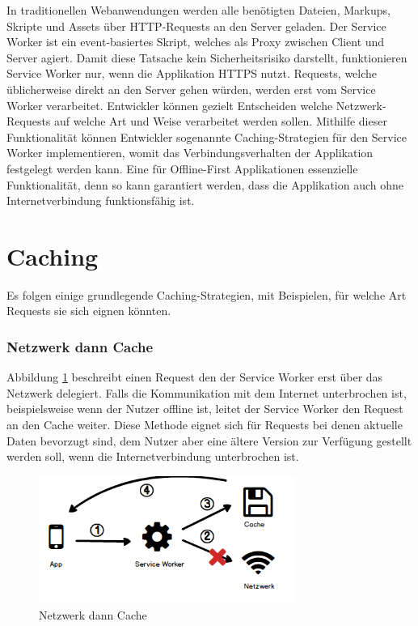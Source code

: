 \documentclass[a4paper, 12pt]{scrreprt}
\begin{document}
In traditionellen Webanwendungen werden alle benötigten Dateien, Markups, Skripte und Assets über HTTP-Requests an den Server geladen. Der Service Worker ist ein event-basiertes Skript, welches als Proxy zwischen Client und Server agiert. Damit diese Tatsache kein Sicherheitsrisiko darstellt, funktionieren Service Worker nur, wenn die Applikation HTTPS nutzt. Requests, welche üblicherweise direkt an den Server gehen würden, werden erst vom Service Worker verarbeitet. Entwickler können gezielt Entscheiden welche Netzwerk-Requests auf welche Art und Weise verarbeitet werden sollen. Mithilfe dieser Funktionalität können Entwickler sogenannte Caching-Strategien für den Service Worker implementieren, womit das Verbindungsverhalten der Applikation festgelegt werden kann\autocite{OnlineServiceWorkersAnIntroduction}. Eine für Offline-First Applikationen essenzielle Funktionalität, denn so kann garantiert werden, dass die Applikation auch ohne Internetverbindung funktionsfähig ist. 

\section{Caching}

Es folgen einige grundlegende Caching-Strategien, mit Beispielen, für welche Art Requests sie sich eignen könnten.

\subsubsection{Netzwerk dann Cache}
Abbildung \ref{fig:cachingNetworkFirst} beschreibt einen Request den der Service Worker erst über das Netzwerk delegiert. Falls die Kommunikation mit dem Internet unterbrochen ist, beispielsweise wenn der Nutzer offline ist, leitet der Service Worker den Request an den Cache weiter. Diese Methode eignet sich für Requests bei denen aktuelle Daten bevorzugt sind, dem Nutzer aber eine ältere Version zur Verfügung gestellt werden soll, wenn die Internetverbindung unterbrochen ist.

\begin{figure}[h]
	\centering
	\includegraphics[width=0.75\textwidth]{networkfirst.png}
	\caption{Netzwerk dann Cache}
	\label{fig:cachingNetworkFirst}
\end{figure}
\end{document}

